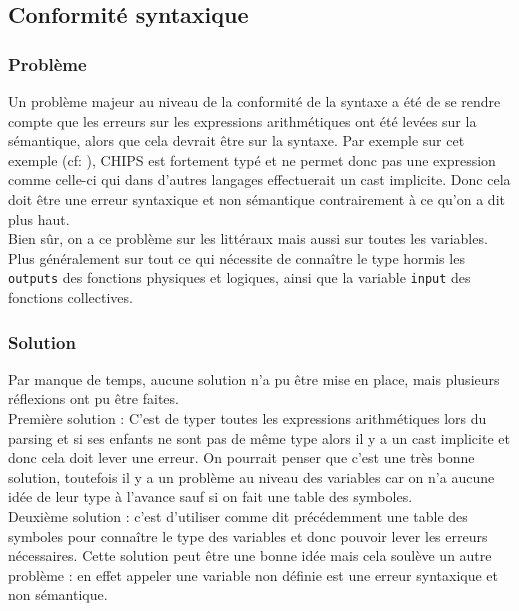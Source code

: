 \documentclass[a4paper, 11pt]{article}
\newcommand{\prog}[1]{\texttt{#1}}
\begin{document}
\subsection{Conformité syntaxique}

\subsubsection*{Problème}

Un problème majeur au niveau de la conformité de la syntaxe a été de se rendre compte que les erreurs sur les expressions arithmétiques ont été levées sur la sémantique, alors que cela devrait être sur la syntaxe.
Par exemple sur cet exemple (cf: ), CHIPS est fortement typé et ne permet donc pas une expression comme celle-ci qui dans d'autres langages effectuerait un cast implicite. Donc cela doit être une erreur syntaxique et non sémantique contrairement à ce qu'on a dit plus haut. \\

Bien sûr, on a ce problème sur les littéraux mais aussi sur toutes les variables. Plus généralement sur tout ce qui nécessite de connaître le type hormis les \prog{outputs} des fonctions physiques et logiques, ainsi que la variable \prog{input} des fonctions collectives.

\subsubsection*{Solution}

Par manque de temps, aucune solution n'a pu être mise en place, mais plusieurs réflexions ont pu être faites. \\

Première solution : C'est de typer toutes les expressions arithmétiques lors du parsing et si ses enfants ne sont pas de même type alors il y a un cast implicite et donc cela doit lever une erreur. On pourrait penser que c'est une très bonne solution, toutefois il y a un problème au niveau des variables car on n'a aucune idée de leur type à l'avance sauf si on fait une table des symboles. \\

Deuxième solution : c'est d'utiliser comme dit précédemment une table des symboles pour connaître le type des variables et donc pouvoir lever les erreurs nécessaires. Cette solution peut être une bonne idée mais cela soulève un autre problème : en effet appeler une variable non définie est une erreur syntaxique et non sémantique. \\
\end{document}
